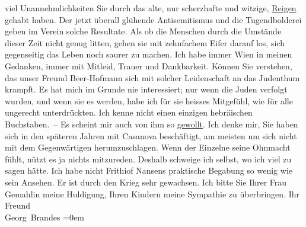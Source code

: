 \begin{ledgroupsized}[t]{13cm}
               viel Unannehmlichkeiten Sie durch das alte, nur scherzhafte und witzige, \uline{Reigen} gehabt haben. Der jetzt überall glühende Antisemitismus und die Tugendbolderei
                  \introOben{}geben\introOben{} im Verein 
               solche Resultate. Als ob die Menschen durch die Umstände dieser Zeit nicht genug
               litten, gehen sie mit zehnfachem Eifer darauf los, sich gegenseitig das Leben noch
               saurer zu machen.\pend
           \pstart
           Ich habe immer Wien in meinen Gedanken, immer mit
               Mitleid, Trauer und Dankbarkeit. Können Sie verstehen, das unser Freund Beer-Hofmann sich {\pb}mit solcher Leidenschaft an das
               Judenthum krampft. Es hat mich im Grunde nie interessiert; nur wenn die Juden
               verfolgt wurden, und wenn sie es werden, habe ich für sie heisses Mitgefühl, wie für
               alle ungerecht unterdrückten. Ich kenne nicht einen einzigen hebräischen
               Buchstaben. – Es scheint mir auch von ihm so \uline{gewollt}.\pend
           \pstart
           Ich denke mir, Sie haben sich in den späteren Jahren mit Casanova beschäftigt, am meisten um sich nicht mit dem
               Gegenwärtigen herumzuschlagen. Wenn der Einzelne seine Ohnmacht fühlt, nützt es ja
               nichts mitzureden. Deshalb schweige ich selbst, wo ich viel zu sagen hätte. Ich habe
               nicht Frithiof Nansens praktische Begabung so
               wenig wie sein Ansehen. Er ist durch den Krieg sehr gewachsen.\pend
           \pstart
           Ich bitte Sie Ihrer Frau Gemahlin meine Huldigung, Ihren Kindern meine Sympathie zu überbringen.\pend
           \pstart
           Ihr Freund{\\[\baselineskip]}\spacefill\mbox{Georg Brandes}\pend
           \leftskip=0em{}\endnumbering{}\end{ledgroupsized}  \newcommand{\dateiname}{L02373}\newcommand{\titel}{Georg Brandes an Arthur Schnitzler, 5. 1. 1922}\newcommand{\editorInnen}{Martin Anton Müller und Gerd-Hermann Susen}
      